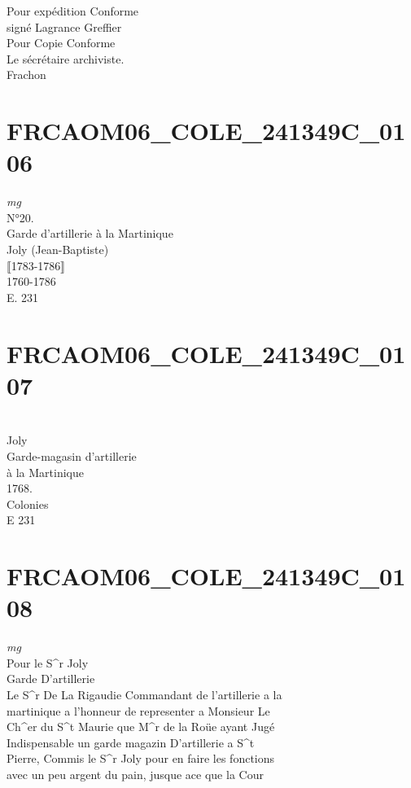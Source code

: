 \documentclass{article}
\begin{document}
\begin{pages}
Pour expédition Conforme\\
signé Lagrance Greffier\\
Pour Copie Conforme\\
Le sécrétaire archiviste.\\
Frachon
\pend
\endnumbering\beginnumbering\section{FRCAOM06\_COLE\_241349C\_0106}
\vspace{0.5cm}\noindent
\textit{mg}
\footnotesize \\
N°20.
\normalsize \pstart
\\
Garde d'artillerie à la Martinique\\
Joly (Jean-Baptiste)\\
⟦1783-1786⟧\\
1760-1786\\
E. 231
\pend
\endnumbering\beginnumbering\section{FRCAOM06\_COLE\_241349C\_0107}\pstart
\\
Joly\\
Garde-magasin d'artillerie\\
à la Martinique\\
1768.\\
Colonies\\
E 231
\pend
\endnumbering\beginnumbering\section{FRCAOM06\_COLE\_241349C\_0108}
\vspace{0.5cm}\noindent
\textit{mg}
\footnotesize \\
Pour le S\^{}r Joly\\
Garde D'artillerie
\normalsize \pstart
\\
Le S\^{}r De La Rigaudie Commandant de l'artillerie a la\\
martinique a l'honneur de representer a Monsieur Le\\
Ch\^{}er du S\^{}t Maurie que M\^{}r de la Roüe ayant Jugé\\
Indispensable un garde magazin D'artillerie a S\^{}t\\
Pierre, Commis le S\^{}r Joly pour en faire les fonctions\\
avec un peu argent du pain, jusque ace que la Cour\\

\end{pages}
\end{document}
